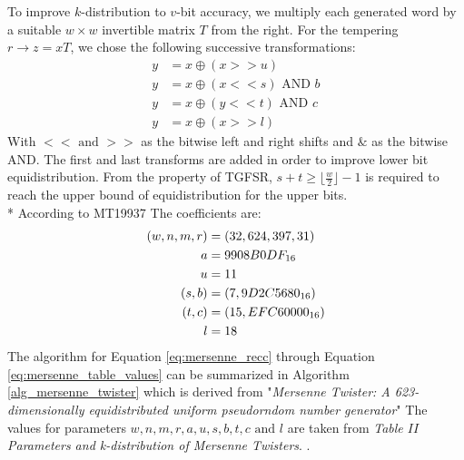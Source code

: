 \documentclass[conference]{IEEEtran}
\begin{document}
To improve $k$-distribution to $v$-bit accuracy, we multiply each generated word by a suitable $w \times w$ invertible matrix $T$ from the right. For the tempering $r \rightarrow z = xT$, we chose the following successive transformations:
\begin{align}
y &= x \oplus (x>>u) \\
y &= x \oplus (x<<s) \text{ AND } b \\
y &= x \oplus (y << t) \text{ AND } c \\
y &= x \oplus (x >> l)
\end{align}
With $<< \text{ and }>>$ as the bitwise left and right shifts and $\&$ as the bitwise AND. The first and last transforms are added in order to improve lower bit equidistribution. From the property of TGFSR, $s+t \geq \lfloor \frac{w}{2}\rfloor -1$ is required to reach the upper bound of equidistribution for the upper bits. \\*
According to MT19937\cite{MT19937} The coefficients are:
\begin{align}
(w,n,m,r) &= (32, 624, 397, 31) \notag \\
a &= 9908B0DF_{16} \notag\\
u &= 11 \notag \\
(s, b) &= (7, 9D2C5680_{16}) \notag \\
(t, c) &= (15, EFC60000_{16}) \notag \\
l &= 18
\label{eq:mersenne_table_values}
\end{align}
The algorithm for Equation \ref{eq:mersenne_recc} through Equation \ref{eq:mersenne_table_values} can be summarized in Algorithm \ref{alg_mersenne_twister} which is derived from "\emph{Mersenne Twister: A 623-dimensionally equidistributed uniform pseudorndom number generator}"\cite{MT19937} The values for parameters $w, n, m, r, a, u, s, b, t, c \text{ and }l$ are taken from \emph{Table $II$ Parameters and k-distribution of Mersenne Twisters}\cite{MT19937}. .
\end{document}
